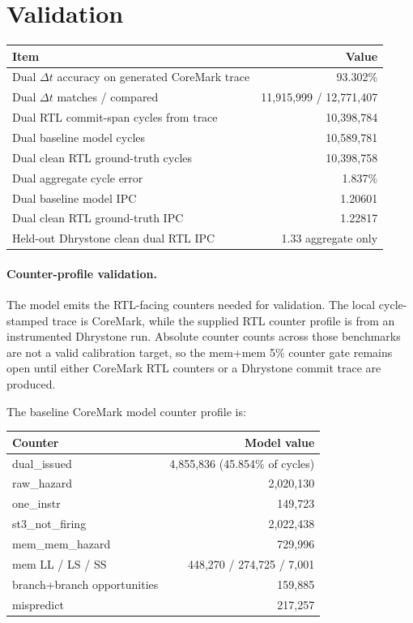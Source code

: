 \documentclass[10pt]{article}
\begin{document}
\section*{Validation}

\begin{tabular}{@{}lr@{}}
\toprule
Item & Value \\
\midrule
Dual $\Delta t$ accuracy on generated CoreMark trace & 93.302\% \\
Dual $\Delta t$ matches / compared & 11,915,999 / 12,771,407 \\
Dual RTL commit-span cycles from trace & 10,398,784 \\
Dual baseline model cycles & 10,589,781 \\
Dual clean RTL ground-truth cycles & 10,398,758 \\
Dual aggregate cycle error & 1.837\% \\
Dual baseline model IPC & 1.20601 \\
Dual clean RTL ground-truth IPC & 1.22817 \\
Held-out Dhrystone clean dual RTL IPC & 1.33 aggregate only \\
\bottomrule
\end{tabular}

\paragraph{Counter-profile validation.}
The model emits the RTL-facing counters needed for validation. The local
cycle-stamped trace is CoreMark, while the supplied RTL counter profile is from
an instrumented Dhrystone run. Absolute counter counts across those benchmarks
are not a valid calibration target, so the mem+mem 5\% counter gate remains
open until either CoreMark RTL counters or a Dhrystone commit trace are produced.

The baseline CoreMark model counter profile is:

\begin{tabular}{@{}lr@{}}
\toprule
Counter & Model value \\
\midrule
dual\_issued & 4,855,836 (45.854\% of cycles) \\
raw\_hazard & 2,020,130 \\
one\_instr & 149,723 \\
st3\_not\_firing & 2,022,438 \\
mem\_mem\_hazard & 729,996 \\
mem LL / LS / SS & 448,270 / 274,725 / 7,001 \\
branch+branch opportunities & 159,885 \\
mispredict & 217,257 \\
\bottomrule
\end{tabular}
\end{document}
